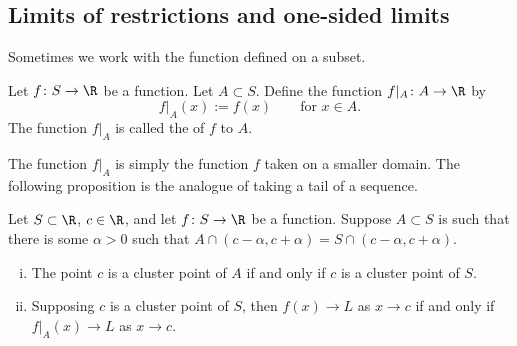 \documentclass[12pt]{book}
\begin{document}
\subsection*{Limits of restrictions and one-sided limits}

Sometimes we work with the function defined on a subset.

\begin{defn}
Let $f \colon S \to \R$ be a function.
Let $A \subset S$.
Define the
function $f|_A \colon A \to \R$ by
\begin{equation*}
f|_A (x) := f(x)  \qquad \text{for $x \in A$}.
\end{equation*}
The function
$f|_A$ is called the \emph{} of $f$ to $A$.
\end{defn}

The function $f|_A$ is simply the function $f$ taken on a smaller domain.
The following proposition is the analogue of taking a tail of a sequence.

\begin{prop} \label{prop:limrest}
Let $S \subset \R$, $c \in \R$, and
let $f \colon S
\to \R$ be a function.
Suppose
$A \subset S$ is such that there is some $\alpha > 0$ such that
$A \cap (c-\alpha,c+\alpha) = S \cap (c-\alpha,c+\alpha)$.
\begin{enumerate}[(i)]
\item The point $c$ is a cluster point of $A$ if and only if $c$ is a cluster point
of $S$.
\item Supposing $c$ is a cluster point of $S$, then $f(x) \to L$ as $x \to c$ if and only if
$f|_A(x) \to L$ as $x \to c$.
\end{enumerate}
\end{prop}
\end{document}
